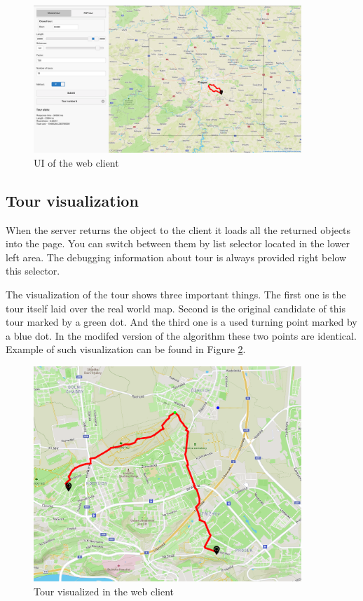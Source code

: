 \documentclass{ctuthesis}
\begin{document}
\begin{figure}
	\includegraphics[width=0.9\textwidth]{UI}
	\caption{UI of the web client}
	\label{fig:UI}
\end{figure}

\subsection{Tour visualization}
When the server returns the  object to the client it loads all the returned  objects into the page. You can switch between them by list selector located in the lower left area. The debugging information about tour is always provided right below this selector. \par
The visualization of the tour shows three important things. The first one is the tour itself laid over the real world map. Second is the original candidate of this tour marked by a green dot. And the third one is a used turning point marked by a blue dot. In the modifed version of the algorithm these two points are identical. Example of such visualization can be found in Figure \ref{fig:vis}.

\begin{figure}
	\includegraphics[width=0.9\textwidth]{plannedTour}
	\caption{Tour visualized in the web client}
	\label{fig:vis}
\end{figure}
\end{document}
